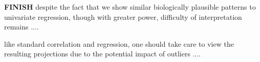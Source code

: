 \documentclass{llncs}
\begin{document}
{\bf FINISH}
despite the fact that we show similar biologically plausible patterns to univariate
regression, though with greater power, 
difficulty of interpretation remains ....  

like standard correlation and regression, one should take care to view the resulting
projections due to the potential impact of outliers .... 





\end{document}
